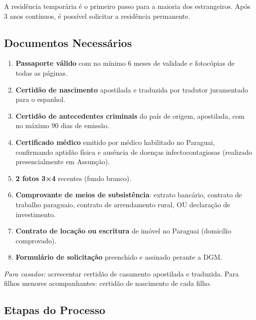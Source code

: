 A residência temporária é o primeiro passo para a maioria dos estrangeiros. Após 3 anos contínuos, é possível solicitar a residência permanente.

\subsection*{Documentos Necessários}

\begin{enumerate}
\item \textbf{Passaporte válido} com no mínimo 6 meses de validade e fotocópias de todas as páginas.
\item \textbf{Certidão de nascimento} apostilada e traduzida por tradutor juramentado para o espanhol.
\item \textbf{Certidão de antecedentes criminais} do país de origem, apostilada, com no máximo 90 dias de emissão.
\item \textbf{Certificado médico} emitido por médico habilitado no Paraguai, confirmando aptidão física e ausência de doenças infectocontagiosas (realizado presencialmente em Assunção).
\item \textbf{2 fotos 3×4} recentes (fundo branco).
\item \textbf{Comprovante de meios de subsistência}: extrato bancário, contrato de trabalho paraguaio, contrato de arrendamento rural, OU declaração de investimento.
\item \textbf{Contrato de locação ou escritura} de imóvel no Paraguai (domicílio comprovado).
\item \textbf{Formulário de solicitação} preenchido e assinado perante a DGM.
\end{enumerate}

\textit{Para casados:} acrescentar certidão de casamento apostilada e traduzida. Para filhos menores acompanhantes: certidão de nascimento de cada filho.

\subsection*{Etapas do Processo}

